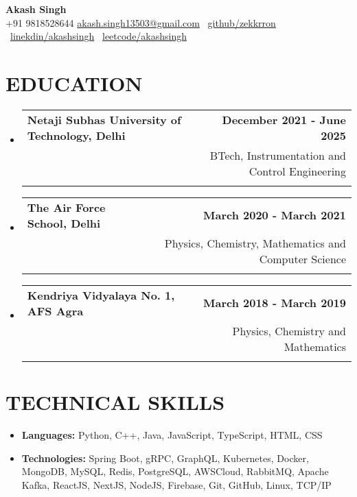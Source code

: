 \documentclass[letterpaper,11pt]{article}
\makeatletter
\newcommand{\cvitem}[1]{
  \item\small{
    {#1\vspace{-2pt}}
  }
}
\newcommand{\cvheading}[4]{
  \vspace{-2pt}\item
  \begin{tabular*}{\textwidth}[t]{l@{\extracolsep{\fill}}r}
    \textbf{#1} & #2 \\
    \ifstrempty{#3}{}{%
      \small#3 & \small#4 \\
    }
  \end{tabular*}\vspace{-7pt}
}
\newcommand{\cvheadingstart}{\begin{itemize}[leftmargin=0in, label={}]}
\newcommand{\cvheadingend}{\end{itemize}}
\newcommand{\cvitemstart}{\begin{itemize}[leftmargin=1.2em, label={\textbullet}]}
\newcommand{\cvitemend}{\end{itemize}\vspace{-5pt}}
\makeatother
\begin{document}
\begin{center}
  \textbf{\LARGE Akash Singh} \\
  \vspace{1pt}\small
  {+91 9818528644}
  \textbullet
  \href{mailto:akash.singh13503@gmail.com}{ akash.singh13503@gmail.com}
  \textbullet\
  \href{https://github.com/zekkrron}{github/zekkrron}
  \textbullet\
  \href{https://www.linkedin.com/in/akash-singh-unique/}{linekdin/akashsingh}
  \textbullet\
  \href{https://leetcode.com/u/zekkrron/}{leetcode/akashsingh}
\end{center}

\vspace{-16pt}
\section{\textbf{EDUCATION}}
\cvheadingstart
  \cvheading
    {Netaji Subhas University of Technology, Delhi}{\textbf{December 2021 - June 2025}}
    {\textbf{CGPA:} 8.09} {BTech, Instrumentation and Control Engineering}
  \cvheading
    {The Air Force School, Delhi}{\textbf{March 2020 - March 2021}}
    {\textbf{12th CBSE:} 95.6$\%$} {Physics, Chemistry, Mathematics and Computer Science}
  \cvheading
    {Kendriya Vidyalaya No. 1, AFS Agra}{\textbf{March 2018 - March 2019}}
    {\textbf{10th CBSE:} 96.2$\%$} {Physics, Chemistry and Mathematics}
\cvheadingend

\section{\textbf{TECHNICAL SKILLS}}
\cvitemstart
  \cvitem{\textbf{Languages:} Python, C++, Java, JavaScript, TypeScript, HTML, CSS}
  \cvitem{\textbf{Technologies:} Spring Boot, gRPC, GraphQL, Kubernetes, Docker, MongoDB, MySQL, Redis, PostgreSQL, AWSCloud, RabbitMQ, Apache Kafka, ReactJS, NextJS, NodeJS, Firebase, Git, GitHub, Linux, TCP/IP}
\cvitemend
\vspace{-10pt}
\end{document}
